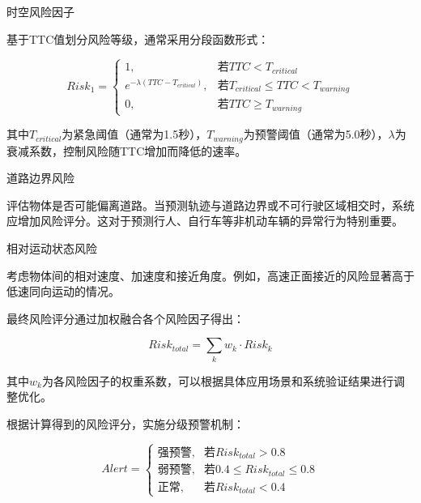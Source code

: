 \documentclass[a4paper, UTF8, fontsize=12pt]{ctexart} %
\numberwithin{equation}{section} %
\begin{document}
\begin{parlist}
    \item 时空风险因子

    基于TTC值划分风险等级，通常采用分段函数形式：

    \begin{equation}
    Risk_1 = \begin{cases}
    1, & \text{若} TTC < T_{critical} \\
    e^{-\lambda(TTC - T_{critical})}, & \text{若} T_{critical} \leq TTC < T_{warning} \\
    0, & \text{若} TTC \geq T_{warning}
    \end{cases}
    \end{equation}

    其中$T_{critical}$为紧急阈值（通常为1.5秒），$T_{warning}$为预警阈值（通常为5.0秒），$\lambda$为衰减系数，控制风险随TTC增加而降低的速率。

    \item 道路边界风险

    评估物体是否可能偏离道路。当预测轨迹与道路边界或不可行驶区域相交时，系统应增加风险评分。这对于预测行人、自行车等非机动车辆的异常行为特别重要。

    \item 相对运动状态风险

    考虑物体间的相对速度、加速度和接近角度。例如，高速正面接近的风险显著高于低速同向运动的情况。
\end{parlist}

最终风险评分通过加权融合各个风险因子得出：

\begin{equation}
Risk_{total} = \sum_{k} w_k \cdot Risk_k
\end{equation}

其中$w_k$为各风险因子的权重系数，可以根据具体应用场景和系统验证结果进行调整优化。

根据计算得到的风险评分，实施分级预警机制：

\begin{equation}
Alert = \begin{cases}
\text{强预警}, & \text{若}  Risk_{total}  > 0.8 \\
\text{弱预警}, & \text{若} 0.4 \leq Risk_{total} \leq 0.8 \\
\text{正常}, & \text{若} Risk_{total} < 0.4
\end{cases}
\end{equation}
\end{document}

